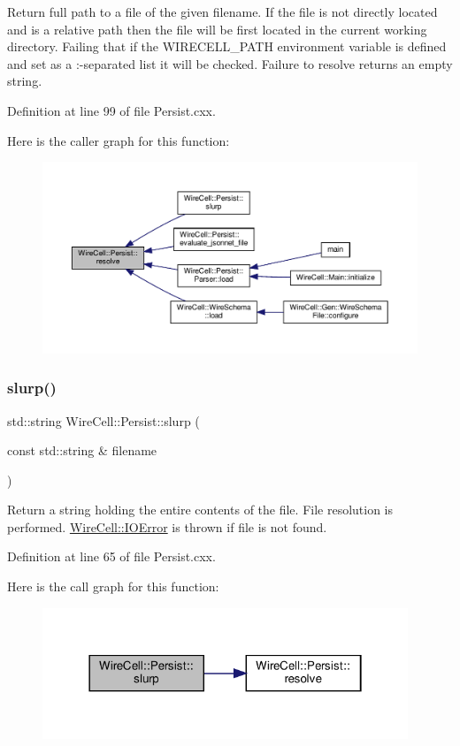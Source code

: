 Return full path to a file of the given filename. If the file is not directly located and is a relative path then the file will be first located in the current working directory. Failing that if the {\ttfamily W\+I\+R\+E\+C\+E\+L\+L\+\_\+\+P\+A\+TH} environment variable is defined and set as a {\ttfamily \+:}-\/separated list it will be checked. Failure to resolve returns an empty string. 

Definition at line 99 of file Persist.\+cxx.

Here is the caller graph for this function\+:
\nopagebreak
\begin{figure}[H]
\begin{center}
\leavevmode
\includegraphics[width=350pt]{namespace_wire_cell_1_1_persist_a222a8187746d148cdc44b0b43b109e53_icgraph}
\end{center}
\end{figure}
\mbox{\label{namespace_wire_cell_1_1_persist_a65787a912677f1990c010e7ee4610a9f}} 
\subsubsection{\texorpdfstring{slurp()}{slurp()}}
{\footnotesize\ttfamily std\+::string Wire\+Cell\+::\+Persist\+::slurp (\begin{DoxyParamCaption}\item[{const std\+::string \&}]{filename }\end{DoxyParamCaption})}

Return a string holding the entire contents of the file. File resolution is performed. \hyperlink{class_wire_cell_1_1_i_o_error}{Wire\+Cell\+::\+I\+O\+Error} is thrown if file is not found. 

Definition at line 65 of file Persist.\+cxx.

Here is the call graph for this function\+:
\nopagebreak
\begin{figure}[H]
\begin{center}
\leavevmode
\includegraphics[width=310pt]{namespace_wire_cell_1_1_persist_a65787a912677f1990c010e7ee4610a9f_cgraph}
\end{center}
\end{figure}
